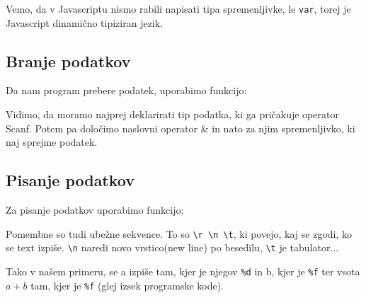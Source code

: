 \documentclass[a4paper, 12pt]{article}
\begin{document}
Vemo, da v Javascriptu nismo rabili napisati tipa spremenljivke, le \texttt{var}, torej je Javascript dinamično tipiziran jezik.

\subsection{Branje podatkov}
Da nam program prebere podatek, uporabimo funkcijo:

\begin{center}
\end{center}

Vidimo, da moramo najprej deklarirati tip podatka, ki ga pričakuje operator Scanf. Potem pa določimo naslovni operator \& in nato za njim spremenljivko, ki naj sprejme podatek.

\subsection{Pisanje podatkov}
Za pisanje podatkov uporabimo funkcijo:
\begin{center}
\end{center}
Pomembne so tudi ubežne sekvence. To so \verb|\r \n \t|, ki povejo, kaj se zgodi, ko se text izpiše. \verb|\n| naredi novo vrstico(new line) po besedilu, \verb|\t| je tabulator...

Tako v našem primeru, se a izpiše tam, kjer je njegov \verb|%d| in b, kjer je \verb|%f| ter vsota $a + b$ tam, kjer je \verb|%f| (glej izsek programske kode).
\end{document}
